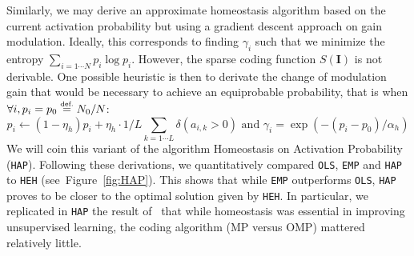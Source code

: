 \documentclass[draft]{article} %
\newcommand{\image}{\mathbf{I}} %
\newcommand{\eqdef}{\ensuremath{\stackrel{\mbox{\upshape\tiny def.}}{=}}}
\newcommand{\seeFig}[1]{Figure~\ref{fig:#1}}%
\begin{document}
Similarly, we may derive an approximate homeostasis algorithm based on the current activation probability but using a gradient descent approach on gain modulation. Ideally, this corresponds to finding $\gamma_i$ such that we minimize the entropy $\sum_{i=1\cdots N} p_i \log p_i$. However, the sparse coding function $S(\image)$ is not derivable. %
One possible heuristic is then to derivate the change of modulation gain that would be necessary to achieve an equiprobable probability, that is when $\forall i, p_i = p_0 \eqdef N_0 / N$: %
\begin{equation}%
p_i \leftarrow (1- \eta_h ) p_i + \eta_h \cdot 1/L\sum_{k=1\cdots L} \delta(a_{i, k} > 0) \textrm{ and }
\gamma_i = \exp(-(p_i - p_0) / \alpha_h)
\end{equation}%
We will coin this variant of the algorithm Homeostasis on Activation Probability (\texttt{HAP}). %
Following these derivations, we quantitatively compared \texttt{OLS}, \texttt{EMP} and \texttt{HAP} to \texttt{HEH} (see~\seeFig{HAP}). This shows that while \texttt{EMP} outperforms \texttt{OLS}, \texttt{HAP} proves to be closer to the optimal solution given by \texttt{HEH}.
In particular, we replicated in \texttt{HAP} the result of~\citet{Sandin17} that while homeostasis was essential in improving unsupervised learning, the coding algorithm (MP versus OMP) mattered relatively little.
\end{document}
